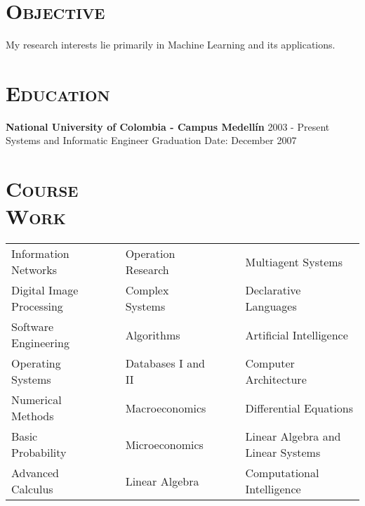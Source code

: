 \begin{resume}



\section{\textsc{Objective}}
My research interests lie primarily in Machine Learning and its
applications.



\section{\textsc{Education}}
\textbf{National University of Colombia - Campus Medell\'{i}n} \hfill 2003 - Present \\
{Systems and Informatic Engineer} \hfill Graduation Date: December 2007\\


\section{\textsc{Course\\ Work}}
  \begin{tabular}{lllll}
Information Networks   & \ \ &  Operation Research   & \ \ &
Multiagent Systems  \\ 
Digital Image Processing     & \ \ & Complex Systems  & \ \ &
Declarative Languages  \\
Software Engineering   & \ \ & Algorithms          & \ \ & Artificial Intelligence     \\
Operating Systems      & \ \ & Databases I and II          & \ \ & Computer Architecture \\
Numerical Methods      & \ \ & Macroeconomics       & \ \ & Differential Equations      \\
Basic Probability      & \ \ & Microeconomics      & \ \ & Linear Algebra and Linear Systems      \\
Advanced Calculus      & \ \ & Linear Algebra    & \ \ & Computational Intelligence   \\
\end{tabular}
\newline


\end{resume}
